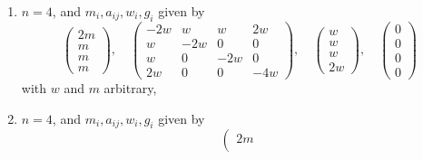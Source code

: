 \begin{lemma}
\begin{enumerate}
$$\begin{matrix}
m \\
2m \\
2m \\
m
\end{matrix}
\right),
\quad
\left(
\begin{matrix}
-4w & 2w & 0 & 0 \\
2w & -2w & w & 0 \\
0 & w & -2w & 2w \\
0 & 0 & 2w & -4w
\end{matrix}
\right),
\quad
\left(
\begin{matrix}
2w \\
w \\
w \\
2w
\end{matrix}
\right),
\quad
\left(
\begin{matrix}
0 \\
0 \\
0 \\
0
\end{matrix}
\right)
$$
with $w$ and $m$ arbitrary,
\item
\label{models-item-triple-with-up}
$n = 4$, and $m_i, a_{ij}, w_i, g_i$ given by
$$
\left(
\begin{matrix}
2m \\
m \\
m \\
m
\end{matrix}
\right),
\quad
\left(
\begin{matrix}
-2w & w & w & 2w \\
w & -2w & 0 & 0 \\
w & 0 & -2w & 0 \\
2w & 0 & 0 & -4w
\end{matrix}
\right),
\quad
\left(
\begin{matrix}
w \\
w \\
w \\
2w
\end{matrix}
\right),
\quad
\left(
\begin{matrix}
0 \\
0 \\
0 \\
0
\end{matrix}
\right)
$$
with $w$ and $m$ arbitrary,
\item
\label{models-item-triple-with-down}
$n = 4$, and $m_i, a_{ij}, w_i, g_i$ given by
$$
\left(
\begin{matrix}
2m \\

\end{matrix}$$
\end{enumerate}
\end{lemma}
